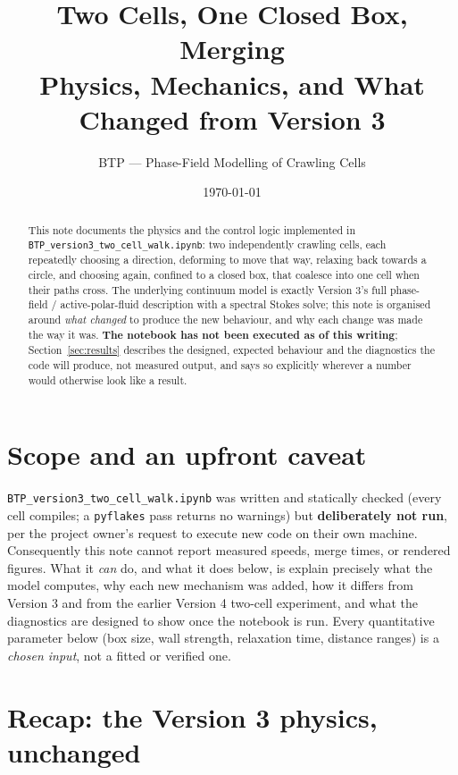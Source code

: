 \documentclass[11pt]{article}
\title{\textbf{Two Cells, One Closed Box, Merging}\\
\large Physics, Mechanics, and What Changed from Version 3}
\author{BTP — Phase-Field Modelling of Crawling Cells}
\date{\today}
\begin{document}
\maketitle

\begin{abstract}
\noindent
This note documents the physics and the control logic implemented in
\texttt{BTP\_version3\_two\_cell\_walk.ipynb}: two independently
crawling cells, each repeatedly choosing a direction, deforming to
move that way, relaxing back towards a circle, and choosing again,
confined to a closed box, that coalesce into one cell when their
paths cross. The underlying continuum model is exactly Version 3's
full phase-field / active-polar-fluid description with a spectral
Stokes solve; this note is organised around \emph{what changed} to
produce the new behaviour, and why each change was made the way it
was. \textbf{The notebook has not been executed as of this writing};
Section~\ref{sec:results} describes the designed, expected behaviour
and the diagnostics the code will produce, not measured output, and
says so explicitly wherever a number would otherwise look like a
result.
\end{abstract}

\tableofcontents

\section{Scope and an upfront caveat}

\texttt{BTP\_version3\_two\_cell\_walk.ipynb} was written and
statically checked (every cell compiles; a \texttt{pyflakes} pass
returns no warnings) but \textbf{deliberately not run}, per the
project owner's request to execute new code on their own machine.
Consequently this note cannot report measured speeds, merge times, or
rendered figures. What it \emph{can} do, and what it does below, is
explain precisely what the model computes, why each new mechanism was
added, how it differs from Version 3 and from the earlier Version 4
two-cell experiment, and what the diagnostics are designed to show
once the notebook is run. Every quantitative parameter below (box
size, wall strength, relaxation time, distance ranges) is a
\emph{chosen input}, not a fitted or verified one.

\section{Recap: the Version 3 physics, unchanged}
\label{sec:v3recap}
\end{document}
